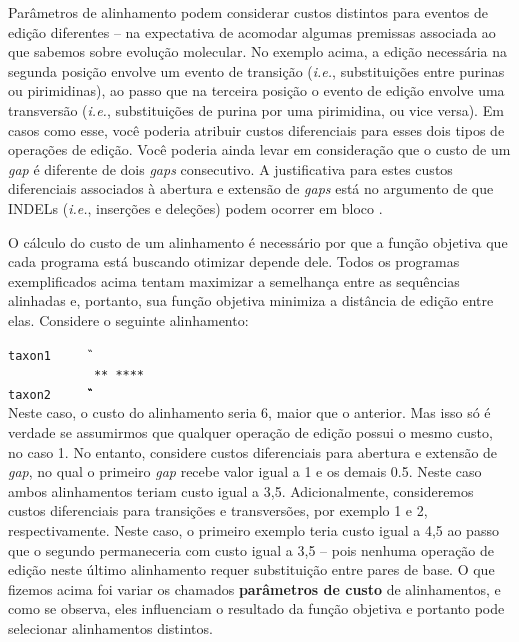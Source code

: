 \begin{refsection}
Parâmetros de alinhamento podem considerar custos distintos para eventos de edição diferentes -- na expectativa de acomodar algumas premissas associada ao que sabemos sobre evolução molecular. No exemplo acima, a edição necessária na segunda posição envolve um evento de transição (\textit{i.e.}, substituições entre purinas ou pirimidinas), ao passo que na terceira posição o evento de edição envolve uma transversão (\textit{i.e.}, substituições de purina por uma pirimidina, ou vice versa). Em casos como esse, você poderia atribuir custos diferenciais para esses dois tipos de operações de edição. Você poderia ainda levar em consideração que o custo de um \textit{gap} é diferente de dois \textit{gaps} consecutivo. A justificativa para estes custos diferenciais associados à abertura e extensão de \textit{gaps} está no argumento de que INDELs (\textit{i.e.}, inserções e deleções) podem ocorrer em bloco \parencite[mas veja ][]{Giribet_and_Wheeler_1999, Phillips_et_al_2000}.

O cálculo do custo de um alinhamento é necessário por que a função objetiva que cada programa está buscando otimizar depende dele. Todos os programas exemplificados acima tentam maximizar a semelhança entre as sequências alinhadas e, portanto, sua função objetiva minimiza a distância de edição entre elas. Considere o seguinte alinhamento:

\indent\indent\indent\indent\indent\indent\indent\texttt{taxon1~~~~~\T\A\T\G\gap\gap\gap\gap\A}\\
\indent\indent\indent\indent\indent\indent\indent\texttt{~~~~~~~~~~~~**~****~}\\
\indent\indent\indent\indent\indent\indent\indent\texttt{taxon2~~~~~\T\gap\gap\G\G\G\C\C\A}\\

Neste caso, o custo do alinhamento seria 6, maior que o anterior. Mas isso só é verdade se assumirmos que qualquer operação de edição possui o mesmo custo, no caso 1. No entanto, considere custos diferenciais para abertura e extensão de \textit{gap}, no qual o primeiro \textit{gap} recebe valor igual a 1 e os demais 0.5. Neste caso ambos alinhamentos teriam custo igual a 3,5. Adicionalmente, consideremos custos diferenciais para transições e transversões, por exemplo 1 e 2, respectivamente. Neste caso, o primeiro exemplo teria custo igual a 4,5 ao passo que o segundo permaneceria com custo igual a 3,5 -- pois nenhuma operação de edição neste último alinhamento requer substituição entre pares de base. O que fizemos acima foi variar os chamados \textbf{parâmetros de custo} de alinhamentos, e como se observa, eles influenciam o resultado da função objetiva e portanto pode selecionar alinhamentos distintos.


\end{refsection}
